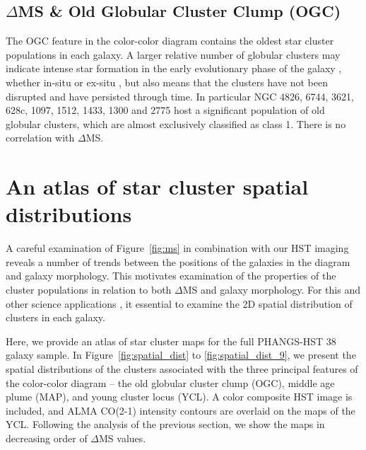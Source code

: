 \documentclass[linenumbers]{aastex63}
\begin{document}
\subsection{$\Delta$MS \& Old Globular Cluster Clump (OGC)}
The OGC feature in the color-color diagram contains the oldest star cluster populations in each galaxy. A larger relative number of globular clusters may indicate intense star formation in the early evolutionary phase of the galaxy \citep{BS06}, whether in-situ or ex-situ \citep[and references therein]{CG19}, but also means that the clusters have not been disrupted and have persisted through time. 
In particular NGC 4826, 6744, 3621, 628c, 1097, 1512, 1433, 1300 and 2775 host a significant population of old globular clusters, which are almost exclusively classified as class 1.  There is no correlation with $\Delta$MS.





\section{An atlas of star cluster spatial distributions}\label{sect:spatialdist}

A careful examination of Figure~\ref{fig:ms} in combination with our HST imaging reveals a number of trends between the positions of the galaxies in the diagram and galaxy morphology.  This motivates examination of the properties of the cluster populations in relation to both $\Delta$MS and galaxy morphology.  For this and other science applications \citep[e.g., calculation of correlation functions, constraints on star formation timescales, and comparison with simulations, e.g.,][]{Gouliermis14, grasha_spatial_2015, grasha_hierarchical_2017, grasha_spatial_2019, turner22}, it essential to examine the 2D spatial distribution of clusters in each galaxy.

Here, we provide an atlas of star cluster maps for the full PHANGS-HST 38 galaxy sample.  In Figure~\ref{fig:spatial_dist} to \ref{fig:spatial_dist_9}, we present the spatial distributions of the clusters associated with the three principal features of the color-color diagram -- the old globular cluster clump (OGC), middle age plume (MAP), and young cluster locus (YCL).  A color composite HST image is included, and ALMA CO(2-1) intensity contours are overlaid on the maps of the YCL. Following the analysis of the previous section, we show the maps in decreasing order of $\Delta$MS values.   
\end{document}
